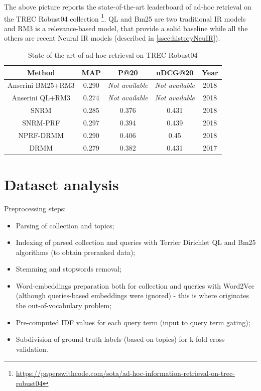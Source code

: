 The above picture reports the state-of-the-art leaderboard of ad-hoc retrieval on the TREC Robust04 collection \footnote{\url{https://paperswithcode.com/sota/ad-hoc-information-retrieval-on-trec-robust04}}.
QL and Bm25 are two traditional IR models and RM3 is a relevance-based model, that provide a solid baseline while all the others are recent Neural IR models (described in \ref{ssec:historyNeuIR}).

\begin{table}[H]
\centering
\begin{tabular}{ccccc}
\textbf{Method} & \textbf{MAP} & \textbf{P@20} & \textbf{nDCG@20} & \textbf{Year} \\ \hline
Anserini BM25+RM3 & 0.290 & \textit{Not available} & \textit{Not available} & 2018 \\ \hline
Anserini QL+RM3 & 0.274 & \textit{Not available} & \textit{Not available} & 2018 \\ \hline
SNRM & 0.285 & 0.376 & 0.431 & 2018 \\ \hline
SNRM-PRF & 0.297 & 0.394 & 0.439 & 2018 \\ \hline
NPRF-DRMM & 0.290 & 0.406 & 0.45 & 2018 \\ \hline
DRMM & 0.279 & 0.382 & 0.431 & 2017 \\ \hline
\end{tabular}
\caption{State of the art of ad-hoc retrieval on TREC Robust04}
\label{table:leaderboardRob04}
\end{table}


\section{Dataset analysis}

Preprocessing steps:

\begin{itemize}
\item Parsing of collection and topics;
\item Indexing of parsed collection and queries with Terrier Dirichlet QL and Bm25 algorithms (to obtain preranked data);
\item Stemming and stopwords removal;
\item Word-embeddings preparation both for collection and queries with Word2Vec (although queries-based embeddings were ignored) - this is where originates the out-of-vocabulary problem;
\item Pre-computed IDF values for each query term (input to query term gating);
\item Subdivision of ground truth labels (based on topics) for k-fold cross validation.
\end{itemize}


